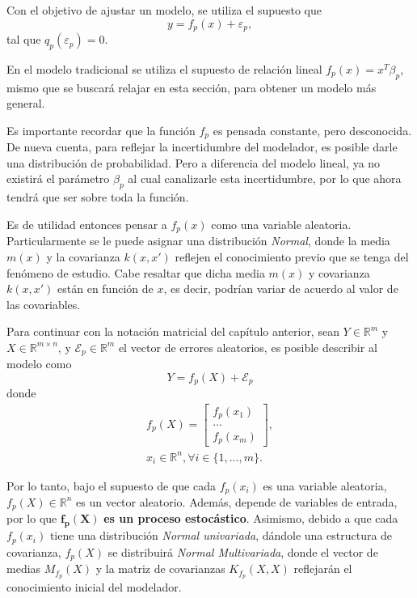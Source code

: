 Con el objetivo de ajustar un modelo, se utiliza el supuesto que
\begin{equation*}
    y = f_p(x) + \varepsilon_p,
\end{equation*}
tal que $q_p(\varepsilon_p)=0$. 

En el modelo tradicional se utiliza el supuesto de relaci\'on lineal $f_p(x) = x^T\beta_p$, mismo que se buscar\'a relajar en esta secci\'on, para obtener un modelo m\'as general.

Es importante recordar que la función $f_p$ es pensada constante, pero desconocida. De nueva cuenta, para reflejar la incertidumbre del modelador, es posible darle una distribución de probabilidad. Pero a diferencia del modelo lineal, ya no existir\'a el parámetro $\beta_p$ al cual canalizarle esta incertidumbre, por lo que ahora tendrá que ser sobre toda la función. 

Es de utilidad entonces pensar a $f_p(x)$ como una variable aleatoria. Particularmente se le puede asignar una distribución \textit{Normal}, donde la media $m(x)$ y la covarianza $k(x,x')$ reflejen el conocimiento previo que se tenga del fenómeno de estudio. Cabe resaltar que dicha media $m(x)$ y covarianza $k(x,x')$ están en función de $x$, es decir, podrían variar de acuerdo al valor de las covariables. 

Para continuar con la notación matricial del cap\'itulo anterior, sean $Y \in \mathbb{R}^m$ y $X \in \mathbb{R}^{m \times n}$, y $\mathcal{E}_p \in \mathbb{R}^m$ el vector de errores aleatorios, es posible describir al modelo como
\begin{equation*}
    Y = f_p(X) + \mathcal{E}_p
\end{equation*}
donde
\begin{equation*}
\begin{aligned}
    f_p(X) =     
    \left[
        \begin{array}{c}
        f_p(x_1)  \\
        ... \\
        f_p(x_m)
        \end{array}
    \right], \\
    x_i \in \mathbb{R}^n, \forall i \in \{1,...,m\}.
\end{aligned}
\end{equation*}

Por lo tanto, bajo el supuesto de que cada $f_p(x_i)$ es una variable aleatoria, $f_p(X) \in \mathbb{R}^n$ es un vector aleatorio. Adem\'as, depende de variables de entrada, por lo que $\bm{f_p(X)}$ \textbf{es un proceso estoc\'astico}. Asimismo, debido a que cada $f_p(x_i)$ tiene una distribuci\'on \textit{Normal univariada}, d\'andole una estructura de covarianza, $f_p(X)$ se distribuir\'a \textit{Normal Multivariada}, donde el vector de medias $M_{f_p}(X)$ y la matriz de covarianzas $K_{f_p}(X,X)$ reflejar\'an el conocimiento inicial del modelador.

